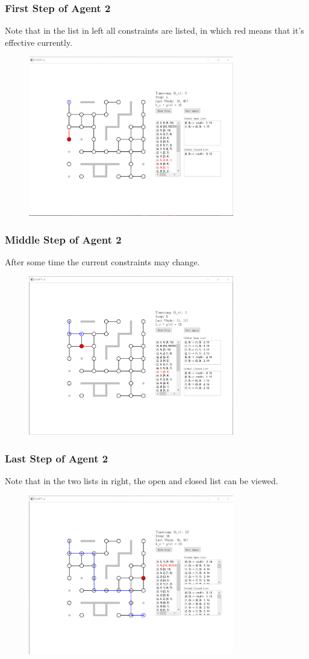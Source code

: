 \documentclass{beamer}
\begin{document}
\begin{frame}
\frametitle{First Step of Agent 2}
Note that in the list in left all constraints are listed, in which red means that it's effective currently.
\begin{figure}
\centering
\includegraphics[width=0.8\textwidth]{5.png}
\end{figure}
\end{frame}

\begin{frame}
\frametitle{Middle Step of Agent 2}
After some time the current constraints may change.
\begin{figure}
\centering
\includegraphics[width=0.8\textwidth]{6.png}
\end{figure}
\end{frame}

\begin{frame}
\frametitle{Last Step of Agent 2}
Note that in the two lists in right, the open and closed list can be viewed.
\begin{figure}
\centering
\includegraphics[width=0.8\textwidth]{7.png}
\end{figure}
\end{frame}
\end{document}
